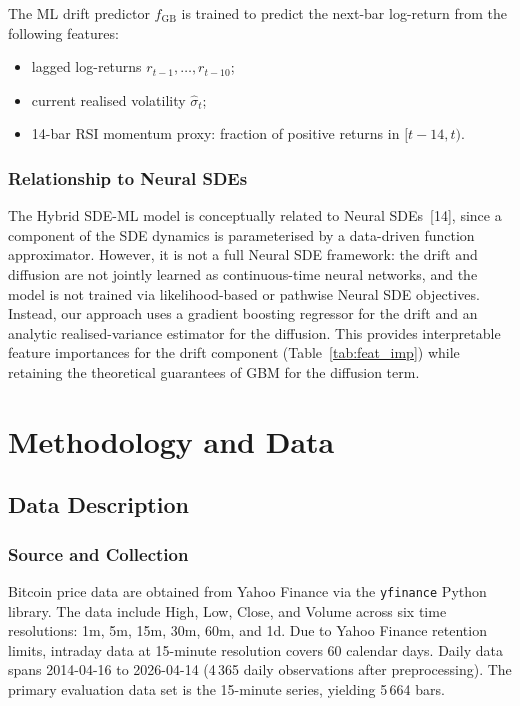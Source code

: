 \documentclass[12pt, a4paper, oneside]{report}
\theoremstyle{plain}
\theoremstyle{definition}
\theoremstyle{remark}
\begin{document}
The ML drift predictor $f_{\text{GB}}$ is trained to predict the next-bar
log-return from the following features:
\begin{itemize}[leftmargin=1.25cm]
  \item lagged log-returns $r_{t-1}, \ldots, r_{t-10}$;
  \item current realised volatility $\hat\sigma_t$;
  \item 14-bar RSI momentum proxy: fraction of positive returns in $[t-14, t)$.
\end{itemize}

\subsection{Relationship to Neural SDEs}

The Hybrid SDE-ML model is conceptually related to Neural SDEs~[14], since a
component of the SDE dynamics is parameterised by a data-driven function
approximator. However, it is not a full Neural SDE framework: the drift and
diffusion are not jointly learned as continuous-time neural networks, and the
model is not trained via likelihood-based or pathwise Neural SDE objectives.
Instead, our approach uses a gradient boosting regressor for the drift and an
analytic realised-variance estimator for the diffusion. This provides
interpretable feature importances for the drift component
(Table~\ref{tab:feat_imp}) while retaining the theoretical guarantees of GBM
for the diffusion term.

\chapter{Methodology and Data}
\label{ch:methodology}

\section{Data Description}

\subsection{Source and Collection}

Bitcoin price data are obtained from Yahoo Finance via the \texttt{yfinance}
Python library.  The data include High, Low, Close, and Volume across six time
resolutions: 1m, 5m, 15m, 30m, 60m, and 1d.  Due to Yahoo Finance retention
limits, intraday data at 15-minute resolution covers 60 calendar days.  Daily
data spans 2014-04-16 to 2026-04-14 (4\,365 daily observations after
preprocessing).  The primary
evaluation data set is the 15-minute series, yielding 5\,664 bars.
\end{document}
